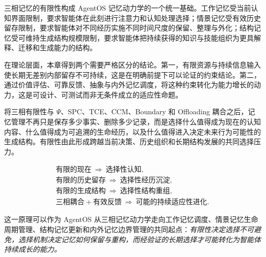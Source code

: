 三相记忆的有限性构成 AgentOS 记忆动力学的一个统一基础。工作记忆受当前认知界面限制，要求智能体在此刻进行注意力和认知处理选择；情景记忆受有效历史留存限制，要求智能体对不同经历实施不同时间尺度的保留、整理与外化；结构记忆受可维持生成结构规模限制，要求智能体把持续获得的知识与技能组织为更具解释、迁移和生成能力的结构。

在理论层面，本章得到两个需要严格区分的结论。第一，有限资源与持续信息输入使长期无差别内部留存不可持续，这是在明确前提下可以论证的约束结论。第二，通过价值评估、可靠反馈、抽象与内外记忆调度，将这种约束转化为能力增长的动力，这是可设计、可测试而非无条件成立的适应性命题。

将三相有限性与 $\Psi$、SPC、TCE、CCM、Boundary 和 Offloading 耦合之后，记忆管理不再只是保存多少事实、删除多少记录，而是选择什么值得成为现在的认知内容、什么值得成为可追溯的生命经历，以及什么值得进入决定未来行为可能性的生成结构。有限性由此形成跨越当前决策、历史组织和长期结构发展的共同选择压力。

\begin{equation}
\label{eq:three-limits-summary}
\boxed{\begin{gathered}
 \text{有限的现在}\ \Rightarrow\ \text{选择性认知},\\[2pt]
 \text{有限的历史留存}\ \Rightarrow\ \text{选择性经历沉淀},\\[2pt]
 \text{有限的生成结构}\ \Rightarrow\ \text{选择性结构重组},\\[5pt]
 \text{三相耦合}+\text{有效反馈}\ \Rightarrow\ \text{可能的持续适应性进化}.
\end{gathered}}
\end{equation}

这一原理可以作为 AgentOS 从三相记忆动力学走向工作记忆调度、情景记忆生命周期管理、结构记忆更新和内外记忆边界管理的共同起点：\emph{有限性决定选择不可避免，选择机制决定记忆如何保留与重构，而经验证的长期选择才可能转化为智能体持续成长的能力。}
